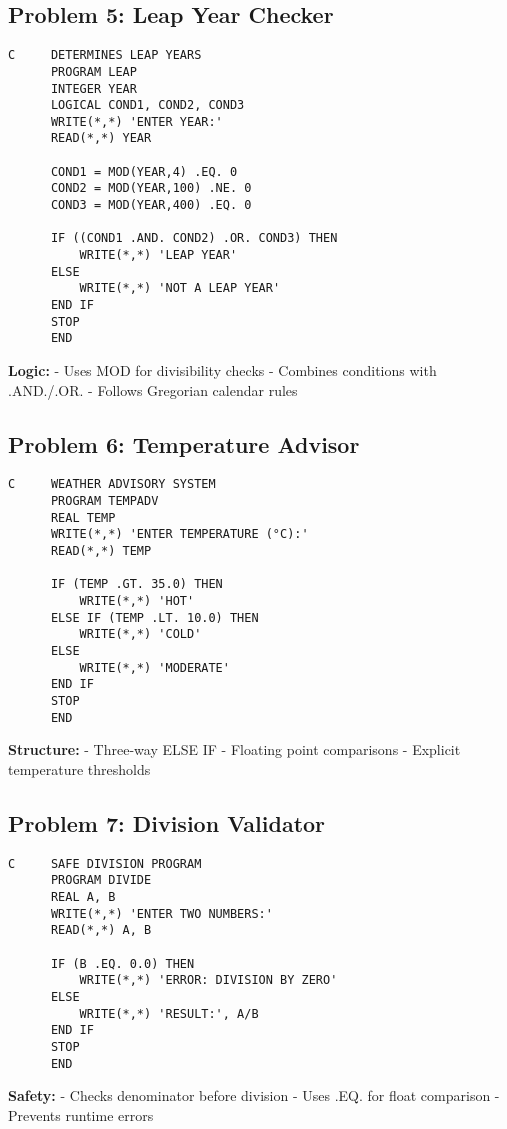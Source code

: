 \documentclass{book}
\begin{document}
\subsection*{Problem 5: Leap Year Checker}
\begin{verbatim}
C     DETERMINES LEAP YEARS
      PROGRAM LEAP
      INTEGER YEAR
      LOGICAL COND1, COND2, COND3
      WRITE(*,*) 'ENTER YEAR:'
      READ(*,*) YEAR
      
      COND1 = MOD(YEAR,4) .EQ. 0
      COND2 = MOD(YEAR,100) .NE. 0
      COND3 = MOD(YEAR,400) .EQ. 0
      
      IF ((COND1 .AND. COND2) .OR. COND3) THEN
          WRITE(*,*) 'LEAP YEAR'
      ELSE
          WRITE(*,*) 'NOT A LEAP YEAR'
      END IF
      STOP
      END
\end{verbatim}
\textbf{Logic:}
- Uses MOD for divisibility checks
- Combines conditions with .AND./.OR.
- Follows Gregorian calendar rules

\subsection*{Problem 6: Temperature Advisor}
\begin{verbatim}
C     WEATHER ADVISORY SYSTEM
      PROGRAM TEMPADV
      REAL TEMP
      WRITE(*,*) 'ENTER TEMPERATURE (°C):'
      READ(*,*) TEMP
      
      IF (TEMP .GT. 35.0) THEN
          WRITE(*,*) 'HOT'
      ELSE IF (TEMP .LT. 10.0) THEN
          WRITE(*,*) 'COLD'
      ELSE
          WRITE(*,*) 'MODERATE'
      END IF
      STOP
      END
\end{verbatim}
\textbf{Structure:}
- Three-way ELSE IF
- Floating point comparisons
- Explicit temperature thresholds

\subsection*{Problem 7: Division Validator}
\begin{verbatim}
C     SAFE DIVISION PROGRAM
      PROGRAM DIVIDE
      REAL A, B
      WRITE(*,*) 'ENTER TWO NUMBERS:'
      READ(*,*) A, B
      
      IF (B .EQ. 0.0) THEN
          WRITE(*,*) 'ERROR: DIVISION BY ZERO'
      ELSE
          WRITE(*,*) 'RESULT:', A/B
      END IF
      STOP
      END
\end{verbatim}
\textbf{Safety:}
- Checks denominator before division
- Uses .EQ. for float comparison
- Prevents runtime errors
\end{document}
